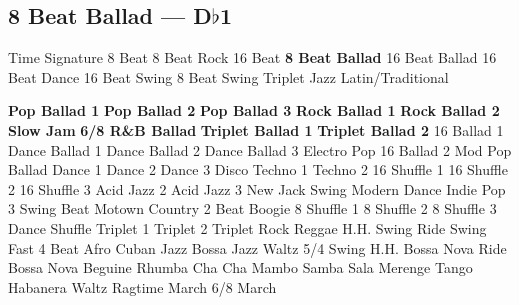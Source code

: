 \subsection{8 Beat Ballad --- \UiKey{\II}\UiKey{\MET}D$\flat$1}
Time Signature
8 Beat
8 Beat Rock
16 Beat
\textbf{8 Beat Ballad}
16 Beat Ballad
16 Beat Dance
16 Beat Swing
8 Beat Swing
Triplet
Jazz
Latin/Traditional





























\textbf{Pop Ballad 1}
\textbf{Pop Ballad 2}
\textbf{Pop Ballad 3}
\textbf{Rock Ballad 1}
\textbf{Rock Ballad 2}
\textbf{Slow Jam}
\textbf{6/8 R\&B Ballad}
\textbf{Triplet Ballad 1}
\textbf{Triplet Ballad 2}
16 Ballad 1
Dance Ballad 1
Dance Ballad 2
Dance Ballad 3
Electro Pop
16 Ballad 2
Mod Pop Ballad
Dance 1
Dance 2
Dance 3
Disco
Techno 1
Techno 2
16 Shuffle 1
16 Shuffle 2
16 Shuffle 3
Acid Jazz 2
Acid Jazz 3
New Jack Swing
Modern Dance
Indie Pop 3
Swing Beat
Motown
Country 2 Beat
Boogie
8 Shuffle 1
8 Shuffle 2
8 Shuffle 3
Dance Shuffle
Triplet 1
Triplet 2
Triplet Rock
Reggae
H.H. Swing
Ride Swing
Fast 4 Beat
Afro Cuban
Jazz Bossa
Jazz Waltz
5/4 Swing
H.H. Bossa Nova
Ride Bossa Nova
Beguine
Rhumba
Cha Cha
Mambo
Samba
Sala
Merenge
Tango
Habanera
Waltz
Ragtime
March
6/8 March
